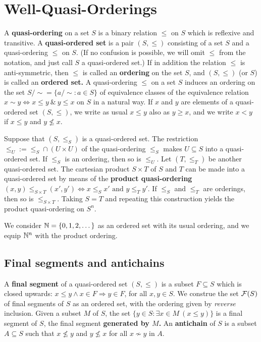 \section{Well-Quasi-Orderings}


A {\bf quasi-ordering} on a set
$S$ is a binary relation $\leq$ on $S$ which is reflexive and
transitive. 
A {\bf quasi-ordered
set} is a pair $(S,\leq)$ consisting of a set $S$ and a quasi-ordering $\leq$
on $S$. (If no confusion is possible, we will omit $\leq$ from the notation,
and just call $S$ a quasi-ordered set.)
If in addition the relation $\leq$ is anti-symmetric,
then $\leq$ is called an {\bf ordering} on the set $S$, and
$(S,\leq)$ (or $S$) is called an {\bf ordered set.}
A quasi-ordering $\leq$ on a set $S$ induces an
ordering on the set $S/{\sim}=\{a/{\sim}:a\in S\}$ 
of equivalence classes of the equivalence
relation $x\sim y 
\Longleftrightarrow x\leq y \ \&\ y\leq x$ on 
$S$ in a natural way. 
If $x$ and $y$ are elements of a  quasi-ordered set $(S,\leq)$, 
we write as usual $x\leq y$ also as $y\geq x$, and 
we write $x<y$ if $x\leq y$ and $y\not\leq x$.


Suppose that $(S,{\leq}_S)$ is a quasi-ordered set.
The restriction ${\leq_U}:={{\leq_S}\cap (U\times U)}$ 
of the quasi-ordering $\leq_S$ makes $U\subseteq S$
into a quasi-ordered set. If $\leq_S$ is an ordering, then
so is  $\leq_U$.  
Let $(T,{\leq}_T)$ be another quasi-ordered set.
The cartesian product $S\times T$ of $S$ and $T$ can be
made into a quasi-ordered set by means of the {\bf product quasi-ordering}
$(x,y) \leq_{S\times T} (x',y') \Longleftrightarrow x\leq_S x' \text{ and }
y\leq_T y'$.
If $\leq_S$ and $\leq_T$ are orderings, then so is $\leq_{S\times T}$.
Taking $S=T$ and repeating this construction yields 
the product quasi-ordering on $S^n$.

\begin{example}\label{example-Nn}
We consider $\N=\{0,1,2,\dots\}$ as an ordered set with its usual ordering, and we equip
$\N^n$ with 
the product ordering. 
\end{example}

\subsection*{Final segments and antichains}
A {\bf final segment} of a  quasi-ordered set $(S,\leq)$ is a
subset $F \subseteq S$ which is closed upwards:
$x\leq y \wedge x\in F \Rightarrow y\in F$, for all $x,y\in S$.
We construe the set ${\cal F}(S)$ of final segments of $S$ as
an ordered set, with the ordering given by {\sl reverse}\/ inclusion.
Given a subset $M$ of $S$, the set 
$\bigl\{y \in S : \exists x \in M\ ( x \leq y ) \bigr\}$
is a final segment of $S$,  the final segment {\bf generated by $M$.}
An {\bf antichain} of $S$ is a subset $A \subseteq S$
such that $x \not\leq y$ and $y\not\leq x$ for all  $x\not\sim y$ in $A$. 


